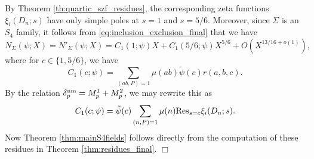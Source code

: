 \documentclass{article}
\def\Res{{\rm Res}}
\def\nm{{\rm nm}}
\def\wt{\widetilde}
\begin{document}
By Theorem \ref{th:quartic_szf_residues}, the corresponding zeta functions $\xi_{i}(D_n;s)$ have only simple poles at $s=1$ and $s=5/6$. Moreover, since $\Sigma$ is an $S_4$ family, it follows from \eqref{eq:inclusion_exclusion_final} that we have
$$
N_\Sigma(\psi;X)=N'_\Sigma(\psi;X) = C_1(1;\psi)X+C_1(5/6;\psi)X^{5/6}+O(X^{13/16+o(1)}),
$$
where for $c\in\{1,5/6\}$, we have
$$
C_1(c;\psi)=\sum_{(ab,P)=1}\mu(ab)\wt{\psi}(c)r(a,b,c).
$$
By the relation $\delta_p^{\nm}=M_p^1+M_p^2$, we may rewrite this as 
$$C_1(c;\psi)=\tilde{\psi}(c)\sum_{(n,P)=1}\mu(n)\Res_{s=c}\xi_{i}(D_{n};s).$$
Now Theorem \ref{thm:mainS4fields} follows directly from the computation of these residues in Theorem \ref{thm:residues_final}. $\Box$




 
\end{document}
